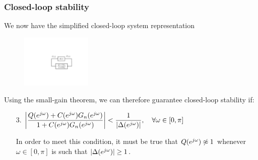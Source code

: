 \begin{frame}
    \frametitle{Closed-loop stability}

    We now have the simplified closed-loop system representation
    \begin{figure}
        \includegraphics[width=0.3\textwidth]{Disturbance_Observer_multi5}
    \end{figure}
    Using the small-gain theorem, we can therefore guarantee closed-loop stability if:
    \begin{enumerate}
    \item[3.]
    $\displaystyle\left| \frac{Q(e^{j\omega}) + C(e^{j\omega}) G_n(e^{j\omega})}{1 + C(e^{j\omega}) G_n(e^{j\omega}) } \right| < \frac{1}{|\Delta(e^{j\omega})|}, \quad \forall \omega \in [0,\pi]$
    \pause
    \newline

    In order to meet this condition, it must be true that $Q(e^{j\omega}) \not\approx 1$ whenever $\omega \in [0,\pi]$ is such that $|\Delta(e^{j\omega})| \geq 1$.

    \end{enumerate}

\end{frame}



